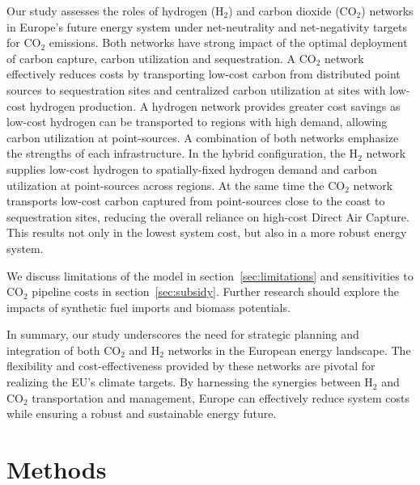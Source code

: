 \documentclass[twocolumn]{article}
\newcommand{\COtwo}{CO$_2$}
\newcommand{\Htwo}{H$_2$}
\newcommand{\carbon}{CO$_2$}
\newcommand{\hydrogen}{H$_2$}
\begin{document}
Our study assesses the roles of hydrogen (\Htwo{}) and carbon dioxide (\COtwo{}) networks in Europe's future energy system under net-neutrality and net-negativity targets for \carbon{} emissions. Both networks have strong impact of the optimal deployment of carbon capture, carbon utilization and sequestration. A \carbon{} network effectively reduces costs by transporting low-cost carbon from distributed point sources to sequestration sites and centralized carbon utilization at sites with low-cost hydrogen production. A hydrogen network provides greater cost savings as low-cost hydrogen can be transported to regions with high demand, allowing carbon utilization at point-sources. A combination of both networks emphasize the strengths of each infrastructure. In the hybrid configuration, the \hydrogen{} network supplies low-cost hydrogen to spatially-fixed hydrogen demand and carbon utilization at point-sources across regions. At the same time the \carbon{} network transports low-cost carbon captured from point-sources close to the coast to sequestration sites, reducing the overall reliance on high-cost Direct Air Capture. This results not only in the lowest system cost, but also in a more robust energy system.

We discuss limitations of the model in section~\ref{sec:limitations} and sensitivities to \carbon{} pipeline costs in section~\ref{sec:subsidy}. Further research should explore the impacts of synthetic fuel imports and biomass potentials.

In summary, our study underscores the need for strategic planning and integration of both \COtwo{} and \Htwo{} networks in the European energy landscape. The flexibility and cost-effectiveness provided by these networks are pivotal for realizing the EU's climate targets. By harnessing the synergies between \Htwo{} and \COtwo{} transportation and management, Europe can effectively reduce system costs while ensuring a robust and sustainable energy future.


\section*{Methods}
\label{sec:methodology}
\end{document}
